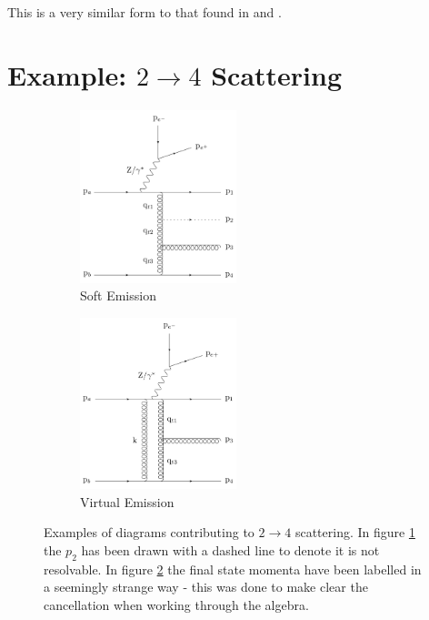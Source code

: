 			This is a very similar form to that found in \cite{Constructing} and \cite{JeppeHiggs}.

	\section{Example: $2\rightarrow4$ Scattering}
	\label{sec:section_name}

		\begin{figure}
		\centering
		\begin{subfigure}[b]
			\centering
			\includegraphics[width=0.5\textwidth]{figures/RealSoftEmissionZ.pdf}
			\caption{Soft Emission}
			\label{fig:real24}
		\end{subfigure}\qquad\qquad
		\begin{subfigure}[b]
			\centering
			\includegraphics[width=0.5\textwidth]{figures/VirtualSoftEmissionZ.pdf}
			\caption{Virtual Emission}
			\label{fig:virtual24}
		\end{subfigure}
		\caption{Examples of diagrams contributing to $2\rightarrow4$ scattering.  In figure \ref{fig:real24} the $p_2$ has been drawn with a dashed line to denote it is not resolvable.  In figure \ref{fig:virtual24} the final state momenta have been labelled in a seemingly strange way - this was done to make clear the cancellation when working through the algebra.}
		\label{fig:2to4}
		\end{figure}

